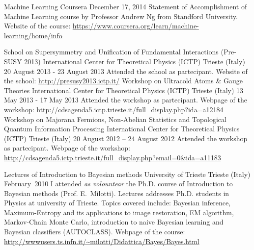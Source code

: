 \begin{cventries}
\cventry
{Machine Learning}
{Coursera}
{}
{December 17, 2014}
{Statement of Accomplishment of Machine Learning course by Professor Andrew Ng
   from Standford University.
   Website of the course:
   \url{https://www.coursera.org/learn/machine-learning/home/info}}


\cventry
{School on Supersymmetry and Unification of Fundamental Interactions (Pre-SUSY
   2013)}
   {International Center for Theoretical Physics (ICTP)}
{Trieste (Italy)}
{20 August 2013 - 23 August 2013}
{Attended the 
  school
   as partecipant. Website of the school:
   \url{http://presusy2013.ictp.it/}}
\cventry
{Workshop on Ultracold Atoms \& Gauge Theories}
   {International Center for Theoretical Physics (ICTP)}
{Trieste (Italy)}
{13 May 2013 - 17 May 2013}
{Attended 
   the workshop as
   partecipant.
   Webpage of the workshop:
   \url{http://cdsagenda5.ictp.trieste.it/full_display.php?ida=a12184}}
\cventry
{Workshop on Majorana Fermions, Non-Abelian Statistics and Topological Quantum Information Processing}%
   {International Center for Theoretical Physics (ICTP)}
{Trieste (Italy)}
{20 August 2012 -- 24 August 2012}
{Attended 
   the workshop 
   as
   partecipant. 
   Webpage of the workshop:
   \url{http://cdsagenda5.ictp.trieste.it/full_display.php?email=0&ida=a11183}}

\cventry
{Lectures of Introduction to Bayesian methods}
{University of Trieste}
{Trieste (Italy)}{}
{February~2010}%
{I attended \emph{as volountear} the Ph.D. course of Introduction to Bayesian methods (Prof.
   E.~Milotti).
   Lectures addresses Ph.D. students in Physics at university of Trieste.
Topics covered include: Bayesian inference, Maximum-Entropy and its applications
to image restoration, EM algorithm, Markov-Chain Monte Carlo, introduction to
naive Bayesian learning and 
Bayesian classifiers (AUTOCLASS). 
Webpage of the course:
\url{http://wwwusers.ts.infn.it/~milotti/Didattica/Bayes/Bayes.html}
}










\end{cventries}
